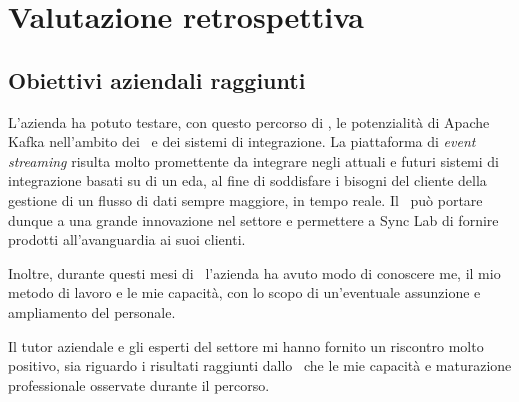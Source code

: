 \chapter{Valutazione retrospettiva}

%
%
%
%
%
%
\section{Obiettivi aziendali raggiunti}

L'azienda ha potuto testare, con questo percorso di \stage, le potenzialità di Apache Kafka nell'ambito dei \middleware\ e dei sistemi di integrazione.
La piattaforma di \textit{event streaming} risulta molto promettente da integrare negli attuali e futuri sistemi di integrazione basati su di un \acrlong{eda}, al fine di soddisfare i bisogni del cliente della gestione di un flusso di dati sempre maggiore, in tempo reale.
Il \software\ può portare dunque a una grande innovazione nel settore  e permettere a Sync Lab di fornire prodotti all'avanguardia ai suoi clienti.

Inoltre, durante questi mesi di \stage\, l'azienda ha avuto modo di conoscere me, il mio metodo di lavoro e le mie capacità, con lo scopo di un'eventuale assunzione e ampliamento del personale.

Il tutor aziendale e gli esperti del settore mi hanno fornito un riscontro molto positivo, sia riguardo i risultati raggiunti dallo \stage\ che le mie capacità e maturazione professionale osservate durante il percorso.

